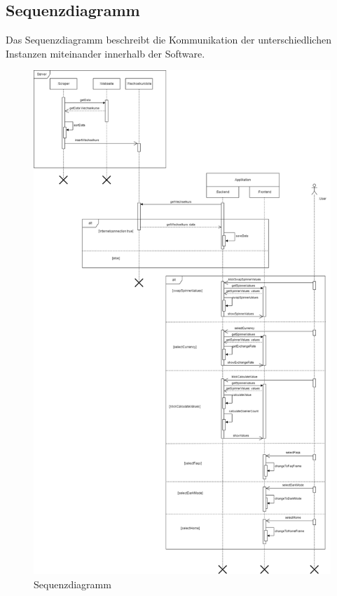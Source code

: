 \documentclass[conference]{IEEEtran}
\begin{document}
\subsection{Sequenzdiagramm}
Das Sequenzdiagramm beschreibt die Kommunikation der unterschiedlichen Instanzen miteinander innerhalb der Software. \\

\begin{figure}[h]
	\centering
	\includegraphics[width=1\linewidth, frame]{Sequenzdiagramm.drawio}
	\caption[Sequenzdiagramm]{Sequenzdiagramm}
	\label{fig:sequenzdiagramm}
\end{figure}
\end{document}
